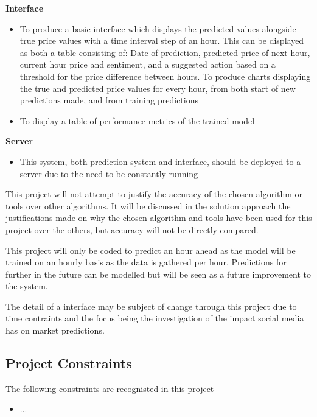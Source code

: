 \documentclass[oneside, 12pt]{article}
\begin{document}
		\textbf{Interface}
		\begin{itemize}
			\item To produce a basic interface which displays the predicted values alongside true price values with a time interval step of an hour. This can be displayed as both a table consisting of: 
			\subitem Date of prediction, predicted price of next hour, current hour price and sentiment, and a suggested action based on a threshold for the price difference between hours.
			\subitem To produce charts displaying the true and predicted price values for every hour, from both start of new predictions made, and from training predictions
			\item To display a table of performance metrics of the trained model
			\newline
		\end{itemize}
	
		\textbf{Server}
		\begin{itemize}
			\item This system, both prediction system and interface, should be deployed to a server due to the need to be constantly running
		\end{itemize}
		
		This project will not attempt to justify the accuracy of the chosen algorithm or tools over other algorithms. It will be discussed in the solution approach the justifications made on why the chosen algorithm and tools have been used for this project over the others, but accuracy will not be directly compared.
		
		This project will only be coded to predict an hour ahead as the model will be trained on an hourly basis as the data is gathered per hour. Predictions for further in the future can be modelled but will be seen as a future improvement to the system.
		
		The detail of a interface may be subject of change through this project due to time contraints and the focus being the investigation of the impact social media has on market predictions.
		
		\subsection{Project Constraints}\label{constraints}
		The following constraints are recognisted in this project
		
		\begin{itemize}
			\item ...
		\end{itemize}
	
\end{document}
